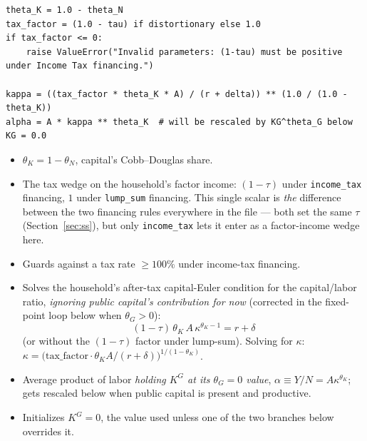 \documentclass[11pt]{article}
\newcommand{\eq}[1]{\begin{equation}#1\end{equation}}
\begin{document}
\begin{lstlisting}[firstnumber=64]
theta_K = 1.0 - theta_N
tax_factor = (1.0 - tau) if distortionary else 1.0
if tax_factor <= 0:
    raise ValueError("Invalid parameters: (1-tau) must be positive under Income Tax financing.")

kappa = ((tax_factor * theta_K * A) / (r + delta)) ** (1.0 / (1.0 - theta_K))
alpha = A * kappa ** theta_K  # will be rescaled by KG^theta_G below
KG = 0.0
\end{lstlisting}
\begin{itemize}
\item[\textbf{L64}] $\theta_K=1-\theta_N$, capital's Cobb--Douglas share.
\item[\textbf{L65}] The tax wedge on the household's factor income:
$(1-\tau)$ under \texttt{income\_tax} financing, $1$ under \texttt{lump\_sum}
financing. This single scalar is \emph{the} difference between the two
financing rules everywhere in the file --- both set the same $\tau$
(Section~\ref{sec:ss}), but only \texttt{income\_tax} lets it enter as a
factor-income wedge here.
\item[\textbf{L66--L67}] Guards against a tax rate $\ge100\%$ under
income-tax financing.
\item[\textbf{L69}] Solves the household's after-tax capital-Euler condition
for the capital/labor ratio, \emph{ignoring public capital's contribution
for now} (corrected in the fixed-point loop below when $\theta_G>0$):
\eq{ (1-\tau)\,\theta_K\, A\,\kappa^{\theta_K-1} = r+\delta \label{eq:euler-ss0} }
(or without the $(1-\tau)$ factor under lump-sum). Solving for $\kappa$:
$\kappa = \big(\text{tax\_factor}\cdot\theta_K A/(r+\delta)\big)^{1/(1-\theta_K)}$.
\item[\textbf{L70}] Average product of labor \emph{holding $K^G$ at its
$\theta_G=0$ value}, $\alpha\equiv Y/N = A\kappa^{\theta_K}$; gets rescaled
below when public capital is present and productive.
\item[\textbf{L71}] Initializes $K^G=0$, the value used unless one of the
two branches below overrides it.
\end{itemize}
\end{document}
